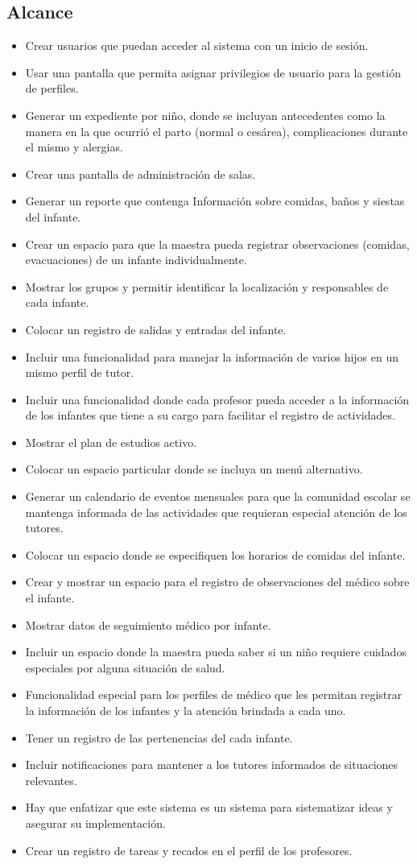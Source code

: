 \documentclass{article}
\begin{document}
\subsection{Alcance}
\begin{itemize}
	\item Crear usuarios que puedan acceder al sistema con un inicio de sesión.
	\item Usar una pantalla que permita asignar privilegios de usuario para la gestión de perfiles.
	\item Generar un expediente por niño, donde se incluyan antecedentes como la manera en la que ocurrió el parto (normal o cesárea), complicaciones durante el mismo y alergias.
	\item Crear una pantalla de administración de salas.
	\item Generar un reporte que contenga Información sobre comidas, baños y siestas del infante.
	\item Crear un espacio para que la maestra pueda registrar observaciones (comidas, evacuaciones) de un infante individualmente.
	\item Mostrar los grupos y permitir identificar la localización y responsables de cada infante.
	\item Colocar un registro de salidas y entradas del infante.
	\item Incluir una funcionalidad para manejar la información de varios hijos en un mismo perfil de tutor.
	\item Incluir una funcionalidad donde cada profesor pueda acceder a la información de los infantes que tiene a su cargo para facilitar el registro de actividades.
	\item Mostrar el plan de estudios activo.
	\item Colocar un espacio particular donde se incluya un menú alternativo.
	\item Generar un calendario de eventos mensuales para que la comunidad escolar se mantenga informada de las actividades que requieran especial atención de los tutores.
	\item Colocar un espacio donde se especifiquen los horarios de comidas del infante.
	\item Crear y mostrar un espacio para el registro de observaciones del médico sobre el infante.
	\item Mostrar datos de seguimiento médico por infante.
	\item Incluir un espacio donde la maestra pueda saber si un niño requiere cuidados especiales por alguna situación de salud.
	\item Funcionalidad especial para los perfiles de médico que les permitan registrar la información de los infantes y la atención brindada a cada uno.
	\item Tener un registro de las pertenencias del cada infante.
	\item Incluir notificaciones para mantener a los tutores informados de situaciones relevantes.
	\item Hay que enfatizar que este sistema es un sistema para sistematizar ideas y asegurar su implementación.
	\item Crear un registro de tareas y recados en el perfil de los profesores.
\end{itemize}
\end{document}
